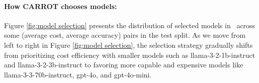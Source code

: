 




\paragraph{How CARROT chooses models:} %
Figure \ref{fig:model selection} presents the distribution of selected models in \newdata\ across some (average cost, average accuracy) pairs in the test split. As we move from left to right in Figure \ref{fig:model selection}, the selection strategy gradually shifts from prioritizing cost efficiency with smaller models such as {llama-3-2-1b-instruct} and {llama-3-2-3b-instruct} to favoring more capable and expensive models like {llama-3-3-70b-instruct}, {gpt-4o}, and {gpt-4o-mini}.





